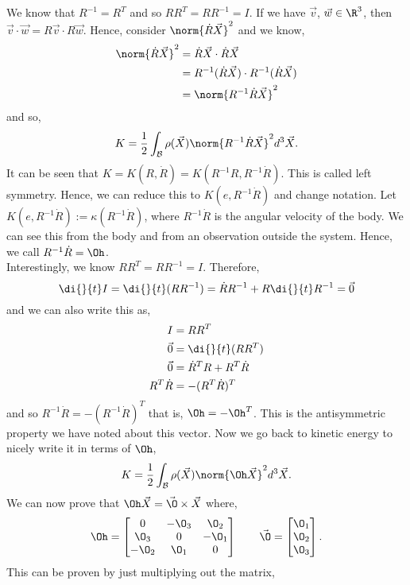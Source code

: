 \noindent
We know that $R^{-1}= R^T$ and so $RR^T = RR^{-1} = I$. If we have $\vec v$, $\vec w \in \R^3$, then $\vec v \cdot\vec w = R \vec v \cdot R\vec w$. Hence, consider $\norm{\dot R \vec X}^2$ and we know,
\begin{align*}
  \norm{\dot R \vec X}^2 &= \dot R \vec X \cdot \dot R \vec X\\
  &= R^{-1}(\dot R \vec X) \cdot R^{-1}(\dot R \vec X)\\
  &= \norm{R^{-1}\dot R \vec X}^2
\end{align*}
and so,
$$ K = \frac{1}{2} \int_\mathcal{B} \rho(\vec X) \norm {R^{-1}\dot R \vec X}^2 d^3\vec X.$$
It can be seen that $K = K(R, \dot R) = K(R^{-1}R, R^{-1}\dot R)$. This is called left symmetry. Hence, we can reduce this to $K(e, R^{-1}\dot R)$ and change notation. Let $K(e, R^{-1}\dot R) := \kappa(R^{-1}\dot R)$, where $R^{-1}\dot R$ is the angular velocity of the body. We can see this from the body and from an observation outside the system. Hence, we call $R^{-1}\dot R = \Oh$.\\
Interestingly, we know $RR^T = RR^{-1} = I$. Therefore,
$$ \di {}{t} I = \di {}{t} (RR^{-1}) = \dot R R^{-1} + R\di{}{t} R^{-1} = \vec 0 $$
and we can also write this as,
\begin{align*}
  I &= RR^T\\
  \vec 0 &= \di {}{t} (RR^T)\\
  \vec 0 &= \dot R^T R + R^T\dot R \\
  R^T\dot R &= - (R^T\dot R)^T
\end{align*}
and so $R^{-1}\dot R = - (R^{-1}\dot R)^T$ that is, $\Oh = - \Oh^T$. This is the antisymmetric property we have noted about this vector. Now we go back to kinetic energy to nicely write it in terms of $\Oh$,
$$ K = \frac{1}{2} \int_\mathcal{B} \rho(\vec X) \norm{\Oh \vec X}^2 d^3\vec X. $$
We can now prove that $\Oh \vec X = \vec \O \times \vec X$
where,
$$ \Oh = \begin{bmatrix}
  0 & -\O_3 & \O_2\\
  \O_3 & 0 & -\O_1\\
  -\O_2 & \O_1 & 0 \\
\end{bmatrix} \qquad \vec\O = \begin{bmatrix}
  \O_1\\ \O_2\\\O_3
\end{bmatrix}. $$
This can be proven by just multiplying out the matrix,
